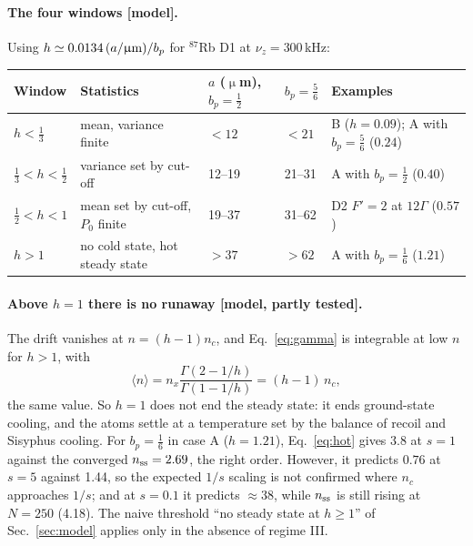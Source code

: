 \documentclass[11pt,a4paper]{article}
\newcommand{\micro}{\upmu}
\begin{document}
\paragraph{The four windows [model].} Using $h\simeq0.0134\,(a/\micro{\rm m})/b_p$ for $^{87}$Rb D1 at $\nu_z=300$\,kHz:

\begin{center}\small
\begin{tabularx}{\textwidth}{@{}llllX@{}}
\toprule
Window & Statistics & $a$ ($\micro$m), $b_p=\tfrac12$ & $b_p=\tfrac56$ & Examples\\
\midrule
$h<\tfrac13$ & mean, variance finite & $<12$ & $<21$ & B ($h=0.09$); A with $b_p=\tfrac56$ ($0.24$)\\
$\tfrac13<h<\tfrac12$ & variance set by cut-off & 12--19 & 21--31 & A with $b_p=\tfrac12$ ($0.40$)\\
$\tfrac12<h<1$ & mean set by cut-off, $P_0$ finite & 19--37 & 31--62 & D2 $F'=2$ at $12\Gamma$ ($0.57$)\\
$h>1$ & no cold state, hot steady state & $>37$ & $>62$ & A with $b_p=\tfrac16$ ($1.21$)\\
\bottomrule
\end{tabularx}
\end{center}

\paragraph{Above $h=1$ there is no runaway [model, partly tested].} The drift vanishes at $n=(h-1)n_c$, and Eq.~\eqref{eq:gamma} is integrable at low $n$ for $h>1$, with
\begin{equation}
  \langle n\rangle=n_x\frac{\Gamma(2-1/h)}{\Gamma(1-1/h)}=(h-1)\,n_c ,
  \label{eq:hot}
\end{equation}
the same value. So $h=1$ does not end the steady state: it ends ground-state cooling, and the atoms settle at a temperature set by the balance of recoil and Sisyphus cooling. For $b_p=\tfrac16$ in case A ($h=1.21$), Eq.~\eqref{eq:hot} gives 3.8 at $s=1$ against the converged $n_{\rm ss}=2.69$, the right order. However, it predicts $0.76$ at $s=5$ against 1.44, so the expected $1/s$ scaling is not confirmed where $n_c$ approaches $1/s$; and at $s=0.1$ it predicts $\approx38$, while $n_{\rm ss}$ is still rising at $N=250$ (4.18). The naive threshold ``no steady state at $h\ge1$'' of Sec.~\ref{sec:model} applies only in the absence of regime III.
\end{document}

